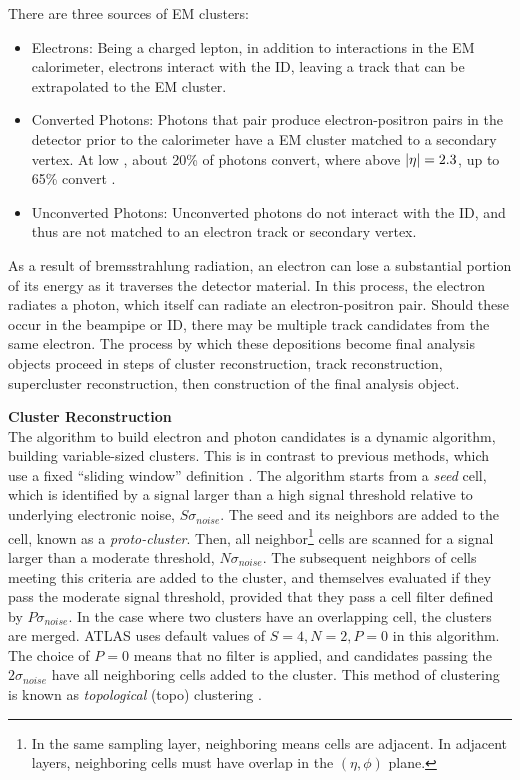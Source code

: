 There are three sources of \gls{EM} clusters:
\begin{itemize}
    \item Electrons: Being a charged lepton, in addition to interactions in the \gls{EM} calorimeter, electrons interact with the \gls{ID}, leaving a track that can be extrapolated to the \gls{EM} cluster.
    \item Converted Photons: Photons that pair produce electron-positron pairs in the detector prior to the calorimeter have a \gls{EM} cluster matched to a secondary vertex. At low \abseta, about 20\% of photons convert, where above $|\eta|=2.3$, up to 65\% convert \cite{photon-electron-perf}.
    \item Unconverted Photons: Unconverted photons do not interact with the \gls{ID}, and thus are not matched to an electron track or secondary vertex.
\end{itemize}

As a result of bremsstrahlung radiation, an electron can lose a substantial portion of its energy as it traverses the detector material. In this process, the electron radiates a photon, which itself can radiate an electron-positron pair. Should these occur in the beampipe or \gls{ID}, there may be multiple track candidates from the same electron. The process by which these depositions become final analysis objects proceed in steps of cluster reconstruction, track reconstruction, supercluster reconstruction, then construction of the final analysis object.


\noindent\textbf{Cluster Reconstruction}\\
\indent The algorithm to build electron and photon candidates is a dynamic algorithm, building variable-sized clusters. This is in contrast to previous methods, which use a fixed ``sliding window'' definition \cite{sliding-window}. The algorithm starts from a \textit{seed} cell, which is identified by a signal larger than a high signal threshold relative to underlying electronic noise, $S\sigma_{noise}$. The seed and its neighbors are added to the cell, known as a \textit{proto-cluster}. Then, all neighbor\footnote{In the same sampling layer, neighboring means cells are adjacent. In adjacent layers, neighboring cells must have overlap in the $(\eta,\phi)$ plane.} cells are scanned for a signal larger than a moderate threshold, $N\sigma_{noise}$. The subsequent neighbors of cells meeting this criteria are added to the cluster, and themselves evaluated if they pass the moderate signal threshold, provided that they pass a cell filter defined by $P\sigma_{noise}$. In the case where two clusters have an overlapping cell, the clusters are merged. ATLAS uses default values of $S=4,N=2,P=0$ in this algorithm. The choice of $P=0$ means that no filter is applied, and candidates passing the $2\sigma_{noise}$ have all neighboring cells added to the cluster. This method of clustering is known as  \textit{topological} (topo) clustering \cite{topo-cluster}. 


